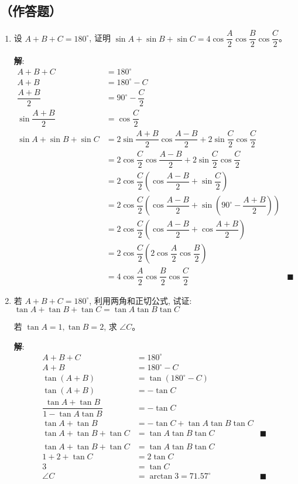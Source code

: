 \documentclass{report}
\newcommand{\sol}{\vspace{0.2cm}\textbf{解}:}
\begin{document}
\subsection*{（作答题）}
\begin{enumerate}[leftmargin=*]
    \item 设 $A+B+C=180^{\circ}$, 证明 $\sin A+\sin B+\sin C=4 \cos \dfrac{A}{2} \cos \dfrac{B}{2} \cos \dfrac{C}{2}$。
    
    \sol{}
    \begin{align*}
        A + B + C &= 180^{\circ} \\
        A + B &= 180^{\circ} - C \\
        \dfrac{A+B}{2} &= 90^{\circ} - \dfrac{C}{2} \\
        \sin \dfrac{A+B}{2} &= \cos \dfrac{C}{2} \\
        \sin A + \sin B + \sin C &= 2\sin \dfrac{A+B}{2}\cos \dfrac{A-B}{2} + 2\sin \dfrac{C}{2}\cos \dfrac{C}{2} \\
        & = 2\cos \dfrac{C}{2}\cos \dfrac{A-B}{2} + 2\sin \dfrac{C}{2}\cos \dfrac{C}{2} \\
        & = 2\cos \dfrac{C}{2}\left(\cos \dfrac{A-B}{2} + \sin \dfrac{C}{2}\right) \\
        & = 2\cos \dfrac{C}{2}\left(\cos \dfrac{A-B}{2} + \sin \left(90^{\circ} - \dfrac{A+B}{2}\right)\right) \\
        & = 2\cos \dfrac{C}{2}\left(\cos \dfrac{A-B}{2} + \cos \dfrac{A+B}{2}\right) \\
        & = 2\cos \dfrac{C}{2}\left(2\cos \dfrac{A}{2}\cos \dfrac{B}{2}\right) \\
        & = 4\cos \dfrac{A}{2}\cos \dfrac{B}{2}\cos \dfrac{C}{2} &\blacksquare
    \end{align*}

    \item 若 $A+B+C=180^{\circ}$, 利用两角和正切公式, 试证: $\tan A+\tan B+\tan C=\tan A \tan B \tan C$
    
    若 $\tan A=1, \tan B=2$, 求 $\angle C$。

    \sol{}
    \begin{align*}
        A + B + C &= 180^{\circ} \\
        A + B &= 180^{\circ} - C \\
        \tan(A + B) &= \tan(180^{\circ} - C) \\
        \tan(A + B) &= -\tan C \\
        \dfrac{\tan A + \tan B}{1 - \tan A \tan B} &= -\tan C \\
        \tan A + \tan B &= -\tan C + \tan A \tan B\tan C \\
        \tan A + \tan B + \tan C &= \tan A \tan B \tan C &\blacksquare\\
        \\
        \tan A + \tan B + \tan C &= \tan A \tan B \tan C \\
        1 + 2 + \tan C &= 2\tan C \\
        3 &= \tan C \\
        \angle C &= \arctan 3 = 71.57^{\circ} &\blacksquare
    \end{align*}


\end{enumerate}
\end{document}
